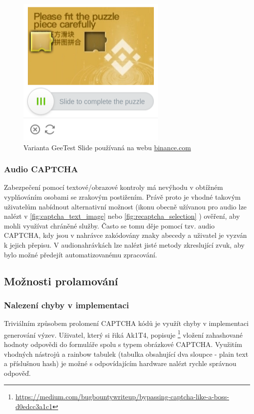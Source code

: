 \documentclass[
  field=ainfp,
  master=true,
  biblatex,
  sourcecodes=false,
  theorems=false,
  glossaries,
  index
]{kidiplom}
\begin{document}
\begin{figure}[H]
  \centering
  \includegraphics[scale=0.7]{images/geetest.png}
  \caption{Varianta GeeTest Slide používaná na webu \url{binance.com}}
  \label{fig:captcha_geetest}
\end{figure}

\subsubsection*{Audio CAPTCHA}
Zabezpečení pomocí textové/obrazové kontroly má nevýhodu v obtížném vyplňováním osobami se zrakovým postižením. Právě proto je vhodné takovým uživatelům nabídnout alternativní možnost (ikonu obecně užívanou pro audio lze nalézt v \ref{fig:captcha_text_image} nebo \ref{fig:recaptcha_selection} ) ověření, aby mohli využívat chráněné služby. Často se tomu děje pomocí tzv. audio CAPTCHA, kdy jsou v nahrávce zakódovány znaky abecedy a uživatel je vyzván k jejich přepisu. V audionahrávkách lze nalézt jisté metody zkreslující zvuk, aby bylo možné předejít automatizovanému zpracování.

\subsection{Možnosti prolamování}
\subsubsection*{Nalezení chyby v implementaci}
Triviálním způsobem prolomení CAPTCHA kódů je využít chyby v implementaci generování výzev. Uživatel, který si řiká Ak1T4, popisuje \footnote{\url{https://medium.com/bugbountywriteup/bypassing-captcha-like-a-boss-d0edcc3a1c1}} vložení zahashované hodnoty odpovědi do formuláře spolu s typem obrázkové CAPTCHA. Využitím vhodných nástrojů a rainbow tabulek (tabulka obsahující dva sloupce - plain text a příslušnou hash) je možné s odpovídajícím hardware nalézt rychle správnou odpověď.
\end{document}

